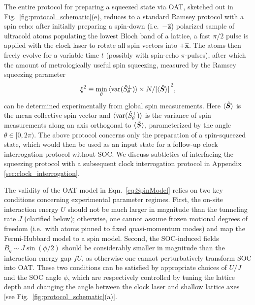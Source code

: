 \documentclass[aps,prx,superscriptaddress,twocolumn]{revtex4-2}
\renewcommand{\t}{\text} %
\renewcommand{\v}{\bm} %
\newcommand{\uv}[1]{\hat{\bm #1}} %
\begin{document}
The entire protocol for preparing a squeezed state via OAT, sketched out in Fig.~\ref{fig:protocol_schematic}(e), reduces to a standard Ramsey protocol with a spin echo: after initially preparing a spin-down (i.e.~$-\uv z$) polarized sample of ultracold atoms populating the lowest Bloch band of a lattice, a fast $\pi/2$ pulse is applied with the clock laser to rotate all spin vectors into $+\uv x$.
The atoms then freely evolve for a variable time $t$ (possibly with spin-echo $\pi$-pulses), after which the amount of metrologically useful spin squeezing, measured by the Ramsey squeezing parameter
\begin{align}
  \xi^2 \equiv
  \min_\theta \braket{\t{var}(\hat S^\perp_\theta)}
  \times N/\abs*{\braket{\hat{\v S}}}^2,
\end{align}
can be determined experimentally from global spin measurements.
Here $\braket{\hat{\v S}}$ is the mean collective spin vector and $\braket{\t{var}(\hat S^\perp_\theta)}$ is the variance of spin measurements along an axis orthogonal to $\braket{\hat{\v S}}$, parameterized by the angle $\theta\in[0,2\pi)$.
The above protocol concerns only the preparation of a spin-squeezed state, which would then be used as an input state for a follow-up clock interrogation protocol without SOC.
We discuss subtleties of interfacing the squeezing protocol with a subsequent clock interrogation protocol in Appendix \ref{sec:clock_interrogation}.

The validity of the OAT model in Eqn.~\eqref{eq:SpinModel} relies on two key conditions concerning experimental parameter regimes.
First, the on-site interaction energy $U$ should not be much larger in magnitude than the tunneling rate $J$ (clarified below); otherwise, one cannot assume frozen motional degrees of freedom (i.e.~with atoms pinned to fixed quasi-momentum modes) and map the Fermi-Hubbard model to a spin model.
Second, the SOC-induced fields $B_q\sim J\sin(\phi/2)$ should be considerably smaller in magnitude than the interaction energy gap $fU$, as otherwise one cannot perturbatively transform SOC into OAT.
These two conditions can be satisfied by appropriate choices of $U/J$ and the SOC angle $\phi$, which are respectively controlled by tuning the lattice depth and changing the angle between the clock laser and shallow lattice axes [see Fig.~\ref{fig:protocol_schematic}(a)].
\end{document}
